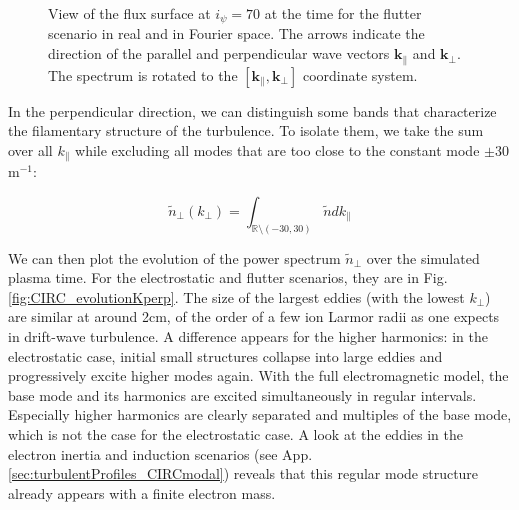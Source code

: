 \begin{figure}[H]
\begin{subfigure}[t]{0.4\textwidth}
		\label{fig:CIRC_fluxSurface_flutter_Fourier}
	\end{subfigure}
	\caption[View of the flux surface at $i_\psi=70$ at the time for the flutter scenario in real and in Fourier space]{View of the flux surface at $i_\psi=70$ at the time for the flutter scenario in real and in Fourier space. The arrows indicate the direction of the parallel and perpendicular wave vectors $\textbf{k}_\parallel$ and $\textbf{k}_\perp$. The spectrum is rotated to the $[\textbf{k}_\parallel,\textbf{k}_\perp]$ coordinate system.}
	\label{fig:CIRC_fluxSurface_flutter}
\end{figure}

In the perpendicular direction, we can distinguish some bands that characterize the filamentary structure of the turbulence. To isolate them, we take the sum over all $k_\parallel$ while excluding all modes that are too close to the constant mode $\pm30$m$^{-1}$:

\begin{equation}
	\tilde{n}_\perp(k_\perp) = \int_{\mathbb{R}\setminus (-30, 30)}\tilde{n}dk_\parallel
\end{equation}

We can then plot the evolution of the power spectrum $\tilde{n}_\perp$ over the simulated plasma time. For the electrostatic and flutter scenarios, they are in Fig. \ref{fig:CIRC_evolutionKperp}. The size of the largest eddies (with the lowest $k_\perp$) are similar at around 2cm, of the order of a few ion Larmor radii as one expects in drift-wave turbulence. A difference appears for the higher harmonics: in the electrostatic case, initial small structures collapse into large eddies and progressively excite higher modes again. With the full electromagnetic model, the base mode and its harmonics are excited simultaneously in regular intervals. Especially higher harmonics are clearly separated and multiples of the base mode, which is not the case for the electrostatic case. A look at the eddies in the electron inertia and induction scenarios (see App. \ref{sec:turbulentProfiles_CIRCmodal}) reveals that this regular mode structure already appears with a finite electron mass.   

